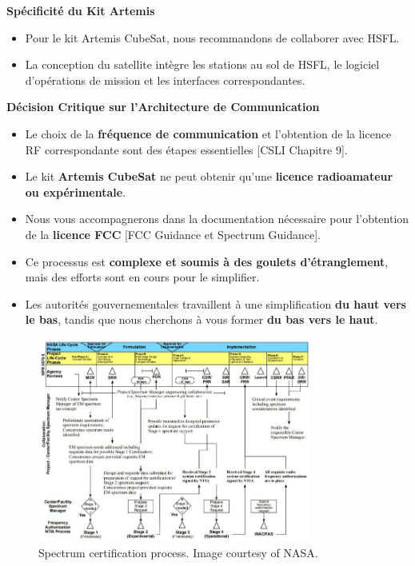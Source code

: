 \textbf{Spécificité du Kit Artemis}
\begin{itemize}
    \item Pour le kit Artemis CubeSat, nous recommandons de collaborer avec HSFL.
    \item La conception du satellite intègre les stations au sol de HSFL, le logiciel d'opérations de mission et les interfaces correspondantes.
\end{itemize}

\textbf{Décision Critique sur l'Architecture de Communication}
\begin{itemize}
    \item Le choix de la \textbf{fréquence de communication} et l'obtention de la licence RF correspondante sont des étapes essentielles [CSLI Chapitre 9].
    \item Le kit \textbf{Artemis CubeSat} ne peut obtenir qu'une \textbf{licence radioamateur ou expérimentale}.
    \item Nous vous accompagnerons dans la documentation nécessaire pour l'obtention de la \textbf{licence FCC} [FCC Guidance et Spectrum Guidance].
    \item Ce processus est \textbf{complexe et soumis à des goulets d'étranglement}, mais des efforts sont en cours pour le simplifier.
    \item Les autorités gouvernementales travaillent à une simplification \textbf{du haut vers le bas}, tandis que nous cherchons à vous former \textbf{du bas vers le haut}.
\end{itemize}
\begin{figure}[H] %
    \centering
    \includegraphics[width=0.8\textwidth]{figures/3.13.jpg}
    \caption{Spectrum certification process. Image courtesy of NASA.}
    \label{fig:communication2}
\end{figure}

